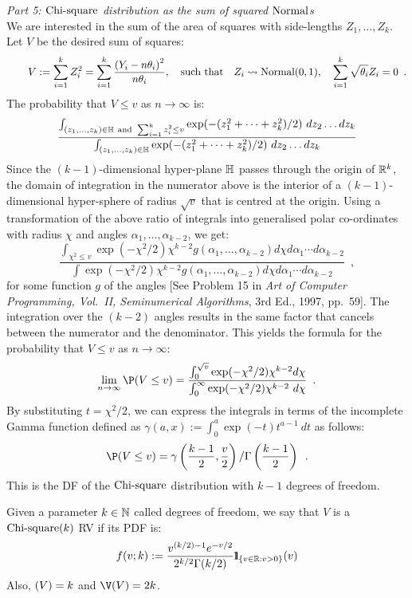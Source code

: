 {\em Part 5: $\mbox{{\rm Chi-square}}$ distribution as the sum of squared $\mbox{{\rm Normal}}$s}\\
We are interested in the sum of the area of squares with side-lengths $Z_1,\ldots,Z_k$.  Let $V$ be the desired sum of squares:
\[
\qquad V := \sum_{i=1}^k Z_i^2 =  \sum_{i=1}^k \frac{\left(Y_i - n \theta_i \right)^2}{{n \theta_i}}  , \quad \text{such that} \quad Z_i \rightsquigarrow \mbox{{\rm Normal}}(0,1), \quad \sum_{i=1}^k \sqrt{\theta_i} Z_i = 0 \enspace .
\]
The probability that $V \leq v$ as $n \to \infty$ is:
\[
\frac{\int_{\substack{(z_1,\ldots,z_k) \in \mathbb{H} \ \text{and} \ \sum_{i=1}^k{z_i^2} \leq v}} \exp(-(z_1^2+\cdots+z_k^2)/2) \ dz_2\ldots dz_k} {\int_{\substack{(z_1,\ldots,z_k) \in \mathbb{H}}} \exp(-(z_1^2+\cdots+z_k^2)/2) \ dz_2\ldots dz_k}
\]
Since the $(k-1)$-dimensional hyper-plane $\mathbb{H}$ passes through the origin of  $\mathbb{R}^k$, the domain of integration in the numerator above is the interior of a $(k-1)$-dimensional hyper-sphere of radius $\sqrt{v}$ that is centred at the origin.  Using a transformation of the above ratio of integrals into generalised polar co-ordinates with radius $\chi$  and angles $\alpha_1,\ldots,\alpha_{k-2}$, we get:
\[
\frac{\int_{\chi^2\leq v} \exp(-\chi^2/2) \chi^{k-2} g(\alpha_1,\ldots,\alpha_{k-2}) d \chi d \alpha_1\cdots d \alpha_{k-2}} {\int \exp(-\chi^2/2) \chi^{k-2} g(\alpha_1,\ldots,\alpha_{k-2}) d \chi d \alpha_1\cdots d \alpha_{k-2}} \enspace ,
\]
for some function $g$ of the angles [See Problem 15 in {\em Art of Computer Programming, Vol.~II, Seminumerical Algorithms}, 3rd Ed., 1997, pp.~59].   The integration over the $(k-2)$ angles results in the same factor that cancels between the numerator and the denominator.  This yields the formula for the probability that $V \leq v$ as $n \rightarrow \infty$:
\[
\lim_{n \to \infty} \P(V \leq v) =  \frac{\int_0^{\sqrt{v}}\exp(-\chi^2/2) \chi^{k-2} d \chi} {\int_0^{\infty}\exp(-\chi^2/2) \chi^{k-2} \ d \chi} \enspace .
\]  
By substituting $t=\chi^2/2$, we can express the integrals in terms of the incomplete Gamma function defined as $\gamma(a,x) :=  \int_0^{a} \exp(-t) t^{a-1} \ dt$ as follows:
\[
\P(V \leq v) = \gamma \left( \frac{k-1}{2},\frac{v}{2} \right) / \Gamma \left(\frac{k-1}{2} \right) \enspace .
\]
This is the DF of the $\mbox{{\rm Chi-square}}$ distribution with $k-1$ degrees of freedom.

\begin{model}[$\chisquare(k)$ RV]  Given a parameter $k \in \mathbb{N}$ called degrees of freedom, we say that $V$ is a $\chisquare(k)$ RV if its PDF is:
\[
f(v; k) :=  \frac{v^{(k/2)-1}e^{-v/2}}{2^{k/2}\Gamma(k/2)} {1}\mspace{-11 mu}{1}_{\{v \in \mathbb{R}: v>0\}}(v)
\]
Also, $\mathscr{(}V)=k$ and $\V(V) = 2k$.
\end{model}


